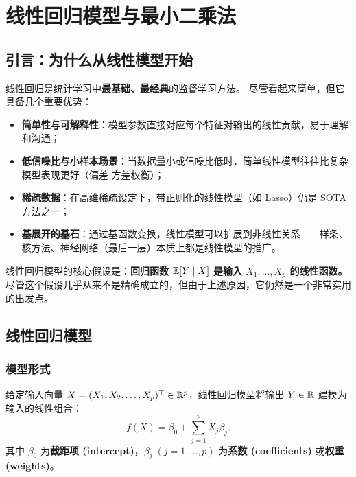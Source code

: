 \chapter{线性回归模型与最小二乘法}

\section{引言：为什么从线性模型开始}

线性回归是统计学习中\textbf{最基础、最经典}的监督学习方法。
尽管看起来简单，但它具备几个重要优势：

\begin{itemize}
    \item \textbf{简单性与可解释性}：模型参数直接对应每个特征对输出的线性贡献，易于理解和沟通；
    \item \textbf{低信噪比与小样本场景}：当数据量小或信噪比低时，简单线性模型往往比复杂模型表现更好（偏差-方差权衡）；
    \item \textbf{稀疏数据}：在高维稀疏设定下，带正则化的线性模型（如 Lasso）仍是 SOTA 方法之一；
    \item \textbf{基展开的基石}：通过基函数变换，线性模型可以扩展到非线性关系——样条、核方法、神经网络（最后一层）本质上都是线性模型的推广。
\end{itemize}

线性回归模型的核心假设是：\textbf{回归函数 $\mathbb{E}[Y \mid X]$ 是输入 $X_1, \dots, X_p$ 的线性函数。}
尽管这个假设几乎从来不是精确成立的，但由于上述原因，它仍然是一个非常实用的出发点。

\section{线性回归模型}

\subsection{模型形式}

\begin{definition}[线性回归模型]
给定输入向量 $X = (X_1, X_2, \dots, X_p)^\top \in \mathbb{R}^p$，线性回归模型将输出 $Y \in \mathbb{R}$ 建模为输入的线性组合：
\begin{equation}\label{eq:linear_model}
    f(X) = \beta_0 + \sum_{j=1}^{p} X_j \beta_j.
\end{equation}
其中 $\beta_0$ 为\textbf{截距项 (intercept)}，$\beta_j\;(j=1,\dots,p)$ 为\textbf{系数 (coefficients)} 或\textbf{权重 (weights)}。
\end{definition}

